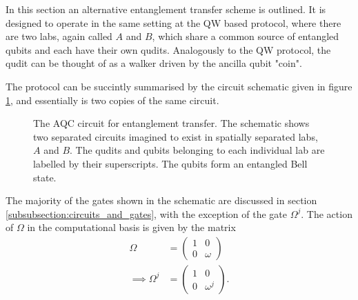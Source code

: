 In this section an alternative entanglement transfer scheme is outlined.
It is designed to operate in the same setting at the QW based protocol, where there are two labs, again called $A$ and $B$, which share a common source of entangled qubits and each have their own qudits.
Analogously to the QW protocol, the qudit can be thought of as a walker driven by the ancilla qubit "coin".

The protocol can be succintly summarised by the circuit schematic given in figure \ref{fig:aqc_circuit_schematic}, and essentially is two copies of the same circuit.

\begin{figure}[h]
    \begin{center}
    \caption{The AQC circuit for entanglement transfer. The schematic shows two separated circuits imagined to exist in spatially separated labs, $A$ and $B$. The qudits and qubits belonging to each individual lab are labelled by their superscripts. The qubits form an entangled Bell state.}
    \label{fig:aqc_circuit_schematic}
    \end{center}
\end{figure}
The majority of the gates shown in the schematic are discussed in section \ref{subsubsection:circuits_and_gates}, with the exception of the gate $\Omega^j$.
The action of $\Omega$ in the computational basis is given by the matrix
\begin{align}
    \Omega &= 
    \begin{pmatrix}
        1 & 0\\
        0 & \omega
    \end{pmatrix}\\
    \implies \Omega^j &=
    \begin{pmatrix}
        1 & 0\\
        0 & \omega^j
    \end{pmatrix}.
\end{align}
